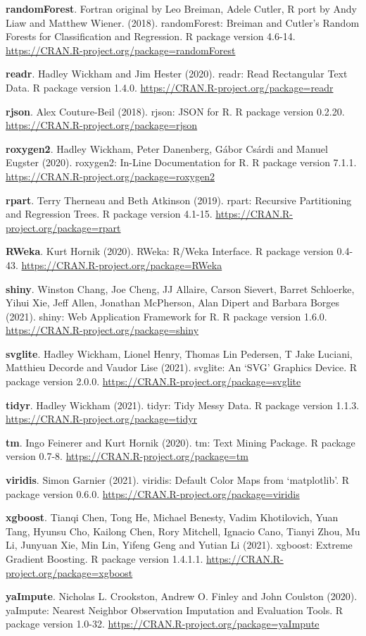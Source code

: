 \documentclass[12pt,]{krantz}
\begin{document}
\textbf{randomForest}. Fortran original by Leo Breiman, Adele Cutler, R
port by Andy Liaw and Matthew Wiener. (2018). randomForest: Breiman and
Cutler's Random Forests for Classification and Regression. R package
version 4.6-14. \url{https://CRAN.R-project.org/package=randomForest}

\textbf{readr}. Hadley Wickham and Jim Hester (2020). readr: Read
Rectangular Text Data. R package version 1.4.0.
\url{https://CRAN.R-project.org/package=readr}

\textbf{rjson}. Alex Couture-Beil (2018). rjson: JSON for R. R package
version 0.2.20. \url{https://CRAN.R-project.org/package=rjson}

\textbf{roxygen2}. Hadley Wickham, Peter Danenberg, Gábor Csárdi and
Manuel Eugster (2020). roxygen2: In-Line Documentation for R. R package
version 7.1.1. \url{https://CRAN.R-project.org/package=roxygen2}

\textbf{rpart}. Terry Therneau and Beth Atkinson (2019). rpart:
Recursive Partitioning and Regression Trees. R package version 4.1-15.
\url{https://CRAN.R-project.org/package=rpart}

\textbf{RWeka}. Kurt Hornik (2020). RWeka: R/Weka Interface. R package
version 0.4-43. \url{https://CRAN.R-project.org/package=RWeka}

\textbf{shiny}. Winston Chang, Joe Cheng, JJ Allaire, Carson Sievert,
Barret Schloerke, Yihui Xie, Jeff Allen, Jonathan McPherson, Alan Dipert
and Barbara Borges (2021). shiny: Web Application Framework for R. R
package version 1.6.0. \url{https://CRAN.R-project.org/package=shiny}

\textbf{svglite}. Hadley Wickham, Lionel Henry, Thomas Lin Pedersen, T
Jake Luciani, Matthieu Decorde and Vaudor Lise (2021). svglite: An `SVG'
Graphics Device. R package version 2.0.0.
\url{https://CRAN.R-project.org/package=svglite}

\textbf{tidyr}. Hadley Wickham (2021). tidyr: Tidy Messy Data. R package
version 1.1.3. \url{https://CRAN.R-project.org/package=tidyr}

\textbf{tm}. Ingo Feinerer and Kurt Hornik (2020). tm: Text Mining
Package. R package version 0.7-8.
\url{https://CRAN.R-project.org/package=tm}

\textbf{viridis}. Simon Garnier (2021). viridis: Default Color Maps from
`matplotlib'. R package version 0.6.0.
\url{https://CRAN.R-project.org/package=viridis}

\textbf{xgboost}. Tianqi Chen, Tong He, Michael Benesty, Vadim
Khotilovich, Yuan Tang, Hyunsu Cho, Kailong Chen, Rory Mitchell, Ignacio
Cano, Tianyi Zhou, Mu Li, Junyuan Xie, Min Lin, Yifeng Geng and Yutian
Li (2021). xgboost: Extreme Gradient Boosting. R package version
1.4.1.1. \url{https://CRAN.R-project.org/package=xgboost}

\textbf{yaImpute}. Nicholas L. Crookston, Andrew O. Finley and John
Coulston (2020). yaImpute: Nearest Neighbor Observation Imputation and
Evaluation Tools. R package version 1.0-32.
\url{https://CRAN.R-project.org/package=yaImpute}

\printindex
\end{document}

